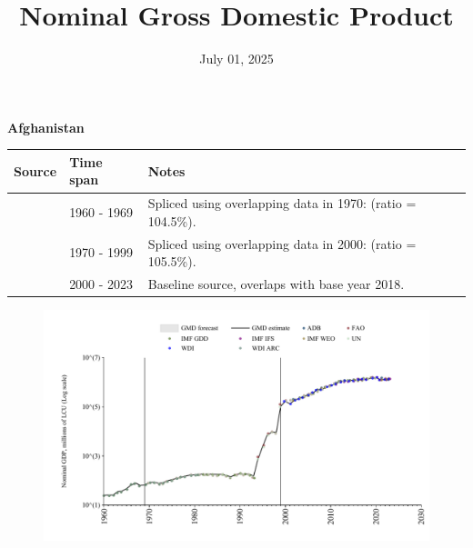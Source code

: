 \documentclass[12pt,a4paper,landscape]{article}
\begin{document}
\title{\Large Nominal Gross Domestic Product}
\date{July 01, 2025}
\maketitle
\thispagestyle{empty}

\clearpage
\setcounter{page}{1}
\hypersetup{colorlinks=true,linkcolor=blue,linktoc=all}
\label{toc}
\tableofcontents
\thispagestyle{empty}
\setcounter{page}{3}
\begin{adjustbox}{max totalsize={\paperwidth}{\paperheight},center}
\begin{minipage}[t][\textheight][t]{\textwidth}
\vspace*{0.5cm}
{}
\begin{center}
{\Large\bfseries Afghanistan}
\end{center}
\vspace{0.5cm}
\begin{table}[H]
\centering
\small
\begin{tabular}{|l|l|l|}
\hline
\textbf{Source} & \textbf{Time span} & \textbf{Notes} \\
\hline
\rowcolor{white}\cite{WDI_ARC}& 1960 - 1969 &Spliced using overlapping data in 1970: (ratio = 104.5\%).\\
\rowcolor{lightgray}\cite{UN}& 1970 - 1999 &Spliced using overlapping data in 2000: (ratio = 105.5\%).\\
\rowcolor{white}\cite{WDI}& 2000 - 2023 &Baseline source, overlaps with base year 2018.\\
\hline
\end{tabular}
\end{table}
\begin{figure}[H]
\centering
\includegraphics[width=\textwidth,height=0.6\textheight,keepaspectratio]{graphs/AFG_nGDP.pdf}
\end{figure}
\end{minipage}
\end{adjustbox}
\end{document}
